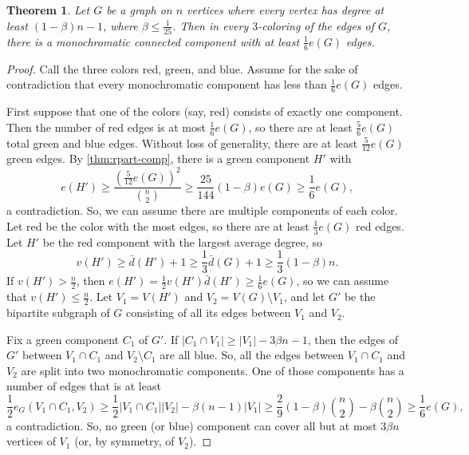 \documentclass[12pt]{amsart}
\newtheorem{theorem}{Theorem}[section]
\theoremstyle{definition}
\numberwithin{equation}{section}
\begin{document}
\begin{theorem}
Let $G$ be a graph on $n$ vertices where every vertex has degree at least $(1-\beta)n-1$, where $\beta \le \frac{1}{25}$. 
Then in every $3$-coloring of the edges of $G$, there is a monochromatic connected component with at least $\frac16 e(G)$ edges.
\end{theorem}
\begin{proof}
    Call the three colors red, green, and blue. Assume for the sake of contradiction that every monochromatic component has less than $\frac{1}{6}e(G)$ edges.
    
    First suppose that one of the colors (say, red) consists of exactly one component. Then the number of red edges is at most $\frac16e(G)$, so there are at least $\frac56e(G)$ total green and blue edges. Without loss of generality,
    there are at least $\frac5{12}e(G)$ green edges. By \cref{thm:rpart-comp}, there is a green component $H'$ with
    \[e(H')\ge \frac{(\frac{5}{12}e(G))^2}{{n\choose 2}} \ge \frac{25}{144}(1-\beta) e(G) \ge \frac16e(G),\]
    a contradiction.
    So, we can assume there are multiple components of each color. 
    Let red be the color with the most edges, so there are at least $\frac13 e(G)$ red edges.
    Let $H'$ be the red component with the largest average degree, so
    \[v(H')\ge \bar d(H')+1\ge \frac{1}{3}\bar d(G)+1\ge \frac{1}{3}(1-\beta)n.\]
    If $v(H')>\frac{n}{2}$, then $e(H')=\frac{1}{2}v(H')\bar d(H')\ge \frac{1}{6}e(G)$, so we can assume that $v(H')\le \frac{n}{2}$. 
    Let $V_1=V(H')$ and $V_2 = V(G)\setminus V_1$, and let $G'$ be the bipartite subgraph of $G$ consisting of all its edges between $V_1$ and $V_2$.
    
    Fix a green component $C_1$ of $G'$. If $|C_1\cap V_1|\ge |V_1|-3\beta n-1$, then the edges of $G'$ between $V_1\cap C_1$ and $V_2\setminus C_1$ are all blue.
    So, all the edges between $V_1\cap C_1$ and $V_2$ are split into two monochromatic components.
    One of those components has a number of edges that is at least 
    \[
    \frac 12 e_G(V_1\cap C_1, V_2) \ge \frac{1}{2}|V_1\cap C_1||V_2|-\beta (n-1)|V_1|\ge \frac{2}{9}(1-\beta)\binom{n}{2}-\beta \binom{n}{2}\ge  \frac 16 e(G),
    \]
    a contradiction. So, no green (or blue) component can cover all but at most $3\beta n$ vertices of $V_1$ (or, by symmetry, of $V_2$).
    

\end{proof}
\end{document}
